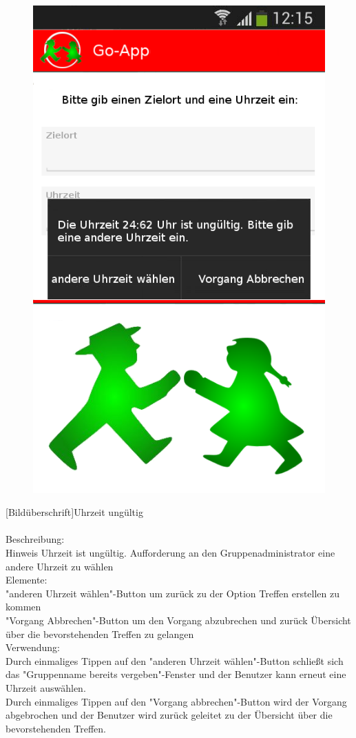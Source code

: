 \begin{figure}
	\includegraphics[scale =1]{resources/images/treffpunkt_erstellen_ungueltig_Zeit.png}
\end{figure}
[Bildüberschrift]Uhrzeit ungültig\\ \\
[Kleinüberschrift]Beschreibung:\\
Hinweis Uhrzeit ist ungültig. Aufforderung an den Gruppenadministrator eine andere Uhrzeit zu wählen\\
[Kleinüberschrift]Elemente:\\
"anderen Uhrzeit wählen"-Button um zurück zu der Option Treffen erstellen zu kommen\\
"Vorgang Abbrechen"-Button um den Vorgang abzubrechen und zurück Übersicht über die bevorstehenden Treffen zu gelangen\\
[Kleinüberschrift]Verwendung:\\
Durch einmaliges Tippen auf den "anderen Uhrzeit wählen"-Button schließt sich das "Gruppenname bereits vergeben"-Fenster und der Benutzer kann erneut eine Uhrzeit auswählen.\\
Durch einmaliges Tippen auf den "Vorgang abbrechen"-Button wird der Vorgang abgebrochen und der Benutzer wird zurück geleitet zu der Übersicht über die bevorstehenden Treffen.\\ \\

